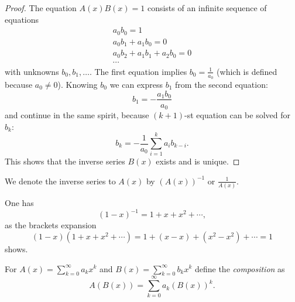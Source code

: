 \begin{page}
\setcounter{section}{2}
\setcounter{subsection}{2}
\setcounter{dfn}{3}
\label{portion:734}

\begin{proof}
The equation $A(x)B(x) = 1$ consists of an infinite sequence of equations
\begin{gather*}
a_0b_0 = 1\\
a_0b_1 + a_1b_0 = 0\\
a_0b_2 + a_1b_1 + a_2b_0 = 0\\
\cdots
\end{gather*}
with unknowns $b_0, b_1, \ldots$.
The first equation implies $b_0 = \frac{1}{a_0}$ (which is defined because $a_0 \ne 0$).
Knowing $b_0$ we can express $b_1$ from the second equation:
\[
b_1 = -\frac{a_1b_0}{a_0}
\]
and continue in the same spirit, because $(k+1)$-st equation can be solved for $b_k$:
\[
b_k = -\frac{1}{a_0}\sum_{i=1}^k a_ib_{k-i}.
\]
This shows that the inverse series $B(x)$ exists and is unique.
\end{proof}

We denote the inverse series to $A(x)$ by $(A(x))^{-1}$ or $\frac{1}{A(x)}$.


\end{page}

\begin{page}
\setcounter{section}{2}
\setcounter{subsection}{2}
\setcounter{dfn}{4}
\label{portion:736}

\begin{exl}
One has
\[
(1-x)^{-1} = 1 + x + x^2 + \cdots,
\]
as the brackets expansion
\[
(1-x)(1+x+x^2+\cdots) = 1 + (x - x) + (x^2 - x^2) + \cdots = 1
\]
shows.
\end{exl}

\end{page}

\begin{page}
\setcounter{section}{2}
\setcounter{subsection}{2}
\setcounter{dfn}{5}
\label{portion:739}

\begin{dfn}
For $A(x) = \sum_{k=0}^\infty a_k x^k$ and $B(x) = \sum_{k=0}^\infty b_k x^k$ define the \emph{composition} as
\[
A(B(x)) = \sum_{k=0}^\infty a_k (B(x))^k.
\]
\end{dfn}

\end{page}

